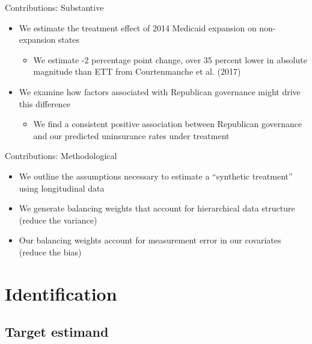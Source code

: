 \documentclass[hyperref={pdfpagelabels=false}]{beamer}
\begin{document}
\begin{frame}{Contributions: Substantive}
\begin{itemize}
    \item We estimate the treatment effect of 2014 Medicaid expansion on non-expansion states \bigskip
    
    \begin{itemize}
        \item We estimate -2 percentage point change, over 35 percent lower in absolute magnitude than ETT from Courtenmanche et al. (2017) \bigskip 
    \end{itemize}

    \item We examine how factors associated with Republican governance might drive this difference \bigskip
    
    \begin{itemize}
        \item We find a consistent positive association between Republican governance and our predicted uninsurance rates under treatment \bigskip 
    \end{itemize}
    \end{itemize}
\end{frame}

\begin{frame}{Contributions: Methodological}
\begin{itemize}
    \item We outline the assumptions necessary to estimate a ``synthetic treatment'' using longitudinal data \bigskip
    
    \item We generate balancing weights that account for hierarchical data structure (reduce the variance) \bigskip
    
    \item Our balancing weights account for measurement error in our covariates (reduce the bias) \bigskip
    \end{itemize}
\end{frame}

\section{Identification}

\subsection{Target estimand}
\end{document}
